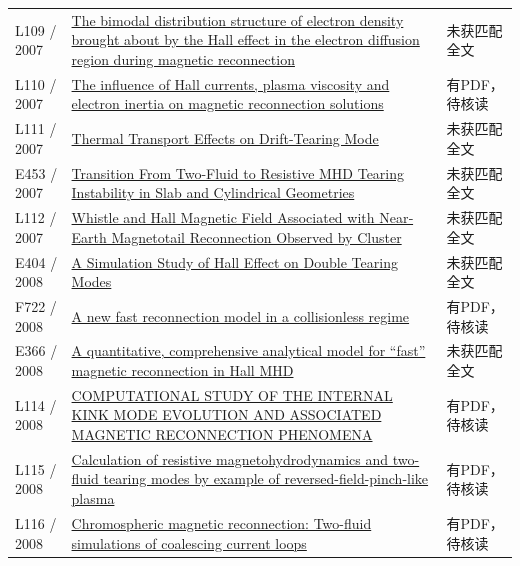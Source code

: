 \documentclass[UTF8,a4paper,11pt,openany,fontset=fandol]{ctexbook}
\begin{document}
\begin{longtable}{P{24mm}P{97mm}P{27mm}}
L109 / 2007 & \href{https://doi.org/10.1063/1.2741241}{The bimodal distribution structure of electron density brought about by the Hall effect in the electron diffusion region during magnetic reconnection} & 未获匹配全文\\

L110 / 2007 & \href{https://hdl.handle.net/10289/2593}{The influence of Hall currents,  plasma viscosity and electron inertia on magnetic reconnection solutions} & 有PDF，待核读\\

L111 / 2007 & \href{https://doi.org/10.1143/jpsj.76.064501}{Thermal Transport Effects on Drift-Tearing Mode} & 未获匹配全文\\

E453 / 2007 & \href{http://absimage.aps.org/image/DPP07/MWS_DPP07-2007-001398.pdf}{Transition From Two-Fluid to Resistive MHD Tearing Instability in Slab and Cylindrical Geometries} & 未获匹配全文\\

L112 / 2007 & \href{https://doi.org/10.1002/cjg2.1069}{Whistle and Hall Magnetic Field Associated with Near‐Earth Magnetotail Reconnection Observed by Cluster} & 未获匹配全文\\

E404 / 2008 & \href{https://doi.org/10.1088/1009-0630/10/4/02}{A Simulation Study of Hall Effect on Double Tearing Modes} & 未获匹配全文\\

F722 / 2008 & \href{https://doi.org/10.1063/1.3029737}{A new fast reconnection model in a collisionless regime} & 有PDF，待核读\\

E366 / 2008 & \href{http://absimage.aps.org/image/DPP08/MWS_DPP08-2008-000188.pdf}{A quantitative,  comprehensive analytical model for ``fast'' magnetic reconnection in Hall MHD} & 未获匹配全文\\

L114 / 2008 & \href{https://doi.org/10.5281/zenodo.3783590}{COMPUTATIONAL STUDY OF THE INTERNAL KINK MODE EVOLUTION AND ASSOCIATED MAGNETIC RECONNECTION PHENOMENA} & 有PDF，待核读\\

L115 / 2008 & \href{https://doi.org/10.1063/1.2917916}{Calculation of resistive magnetohydrodynamics and two-fluid tearing modes by example of reversed-field-pinch-like plasma} & 有PDF，待核读\\

L116 / 2008 & \href{https://doi.org/10.1051/0004-6361:200809624}{Chromospheric magnetic reconnection: Two-fluid simulations of coalescing current loops} & 有PDF，待核读\\


\end{longtable}
\end{document}
